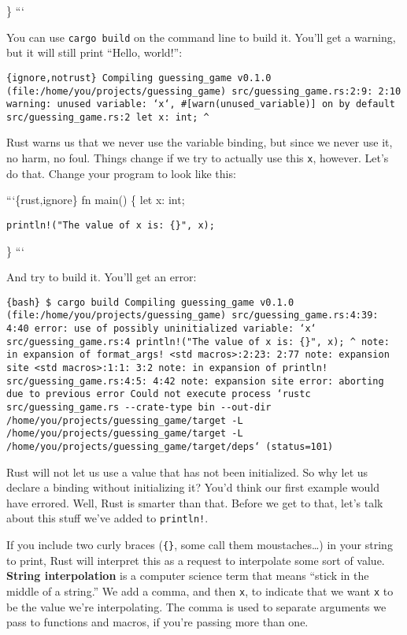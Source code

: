 \documentclass[]{article}
\begin{document}
\} ```

You can use \texttt{cargo build} on the command line to build it. You'll
get a warning, but it will still print ``Hello, world!'':

\texttt{\{ignore,notrust\}    Compiling guessing\_game v0.1.0 (file:/home/you/projects/guessing\_game) src/guessing\_game.rs:2:9: 2:10 warning: unused variable: `x`, \#{[}warn(unused\_variable){]} on by default src/guessing\_game.rs:2     let x: int;                                \^{}}

Rust warns us that we never use the variable binding, but since we never
use it, no harm, no foul. Things change if we try to actually use this
\texttt{x}, however. Let's do that. Change your program to look like
this:

```\{rust,ignore\} fn main() \{ let x: int;

\begin{verbatim}
println!("The value of x is: {}", x);
\end{verbatim}

\} ```

And try to build it. You'll get an error:

\texttt{\{bash\} \$ cargo build    Compiling guessing\_game v0.1.0 (file:/home/you/projects/guessing\_game) src/guessing\_game.rs:4:39: 4:40 error: use of possibly uninitialized variable: `x` src/guessing\_game.rs:4     println!("The value of x is: \{\}", x);                                                              \^{} note: in expansion of format\_args! \textless{}std macros\textgreater{}:2:23: 2:77 note: expansion site \textless{}std macros\textgreater{}:1:1: 3:2 note: in expansion of println! src/guessing\_game.rs:4:5: 4:42 note: expansion site error: aborting due to previous error Could not execute process `rustc src/guessing\_game.rs -\/-crate-type bin -\/-out-dir /home/you/projects/guessing\_game/target -L /home/you/projects/guessing\_game/target -L /home/you/projects/guessing\_game/target/deps` (status=101)}

Rust will not let us use a value that has not been initialized. So why
let us declare a binding without initializing it? You'd think our first
example would have errored. Well, Rust is smarter than that. Before we
get to that, let's talk about this stuff we've added to
\texttt{println!}.

If you include two curly braces (\texttt{\{\}}, some call them
moustaches\ldots{}) in your string to print, Rust will interpret this as
a request to interpolate some sort of value. \textbf{String
interpolation} is a computer science term that means ``stick in the
middle of a string.'' We add a comma, and then \texttt{x}, to indicate
that we want \texttt{x} to be the value we're interpolating. The comma
is used to separate arguments we pass to functions and macros, if you're
passing more than one.
\end{document}
